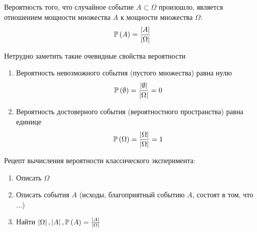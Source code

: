 \begin{definition}[Вероятность]
    Вероятность того, что случайное событие $A\subset\Omega$ произошло,
    является отношением мощности множества $A$ к мощности множества $\Omega$:
    $$\mathbb{P}\left( A \right)=\frac{\left|A\right|}{\left|\Omega\right|}$$
\end{definition}
\begin{remark}
    Нетрудно заметить такие очевидные свойства вероятности

    \begin{enumerate}
        \item Вероятность невозможного события (пустого множества) равна нулю
            $$\mathbb{P}\left( \emptyset \right)
                =\frac{\left|\emptyset\right|}{\left|\Omega\right|}=0$$
        \item Вероятность достоверного события (вероятностного пространства)
            равна единице
            $$\mathbb{P}\left( \Omega \right)
                =\frac{\left|\Omega\right|}{\left|\Omega\right|}=1$$
    \end{enumerate}
\end{remark}

Рецепт вычисления вероятности классического эксперимента:
\begin{enumerate}
\item Описать $\Omega$
\item Описать события $A$
    (исходы, благоприятный событию $A$, состоят в том, что ...)
\item Найти $\left|\Omega\right|, \left|A\right|, \mathbb{P}\left( A \right)
    =\frac{\left|A\right|}{\left|\Omega\right|}$
\end{enumerate}

